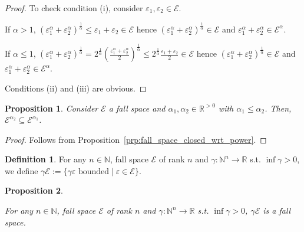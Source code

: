 \documentclass{article}
\numberwithin{equation}{section}
\theoremstyle{definition}
\newtheorem{definition}{Definition}[section]
\theoremstyle{plain}
\newtheorem{proposition}{Proposition}[section]
\newcommand{\Nats}{\mathbb{N}}
\newcommand{\Reals}{\mathbb{R}}
\newcommand{\Fall}{\mathcal{E}}
\begin{document}
\begin{proof}

To check condition (i), consider $\varepsilon_1, \varepsilon_2 \in \Fall$. 

If $\alpha > 1$, $(\varepsilon_1^\alpha + \varepsilon_2^\alpha)^\frac{1}{\alpha} \leq \varepsilon_1 + \varepsilon_2 \in \Fall$ hence $(\varepsilon_1^\alpha + \varepsilon_2^\alpha)^\frac{1}{\alpha} \in \Fall$ and $\varepsilon_1^\alpha + \varepsilon_2^\alpha \in \Fall^\alpha$.

If $\alpha \leq 1$, $(\varepsilon_1^\alpha + \varepsilon_2^\alpha)^\frac{1}{\alpha} = 2^\frac{1}{\alpha}(\frac{\varepsilon_1^\alpha + \varepsilon_2^\alpha}{2})^\frac{1}{\alpha} \leq 2^\frac{1}{\alpha} \frac{\varepsilon_1+\varepsilon_2}{2} \in \Fall$ hence $(\varepsilon_1^\alpha + \varepsilon_2^\alpha)^\frac{1}{\alpha} \in \Fall$ and $\varepsilon_1^\alpha + \varepsilon_2^\alpha \in \Fall^\alpha$.

Conditions (ii) and (iii) are obvious.
\end{proof}

\begin{proposition}

Consider $\Fall$ a fall space and $\alpha_1,\alpha_2 \in \Reals^{>0}$ with $\alpha_1 \leq \alpha_2$. Then, ${\Fall^{\alpha_2} \subseteq \Fall^{\alpha_1}}$.

\end{proposition}

\begin{proof}

Follows from Proposition~\ref{prp:fall_space_closed_wrt_power}.
\end{proof}

\begin{samepage}
\begin{definition}

For any $n \in \Nats$, fall space $\Fall$ of rank $n$ and $\gamma: \Nats^n \rightarrow \Reals$ s.t. $\inf \gamma > 0$, we define $\gamma \Fall := \{\gamma \varepsilon \text{ bounded} \mid \varepsilon \in \Fall\}$.

\end{definition}
\end{samepage}

\begin{samepage}
\begin{proposition}
\label{prp:tbd}

For any $n \in \Nats$, fall space $\Fall$ of rank $n$ and $\gamma: \Nats^n \rightarrow \Reals$ s.t. $\inf \gamma > 0$, $\gamma \Fall$ is a fall space.

\end{proposition}
\end{samepage}
\end{document}
